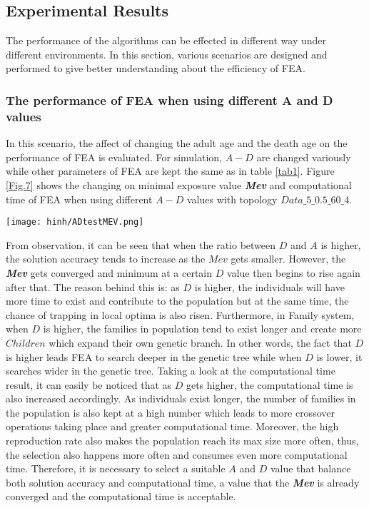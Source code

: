 \documentclass[final]{elsarticle}
\begin{document}
\subsection{Experimental Results}
The performance of the algorithms can be effected in different way under different environments. In this section, various scenarios are designed and performed to give better understanding about the efficiency of FEA.
\subsubsection{The performance of FEA when using different A and D values}
In this scenario, the affect of changing the adult age and the death age on the performance of FEA is evaluated. For simulation, $A - D$ are changed variously while other parameters of FEA are kept the same as in table \ref{tab1}. Figure \ref{Fig.7} shows the changing on minimal exposure value \textit{\textbf{Mev}} and computational time of FEA when using different $A-D$ values with topology $Data\_5\_0.5\_60\_4$.
\begin{figure*}[h]
	\texttt{[image: hinh/ADtestMEV.png]}
	\centering
	\caption{The minimal exposure value when using different A-D values
	}
	\label{Fig.7}       %
\end{figure*}

From observation, it can be seen that when the ratio between $D$ and $A$ is higher, the solution accuracy tends to increase as the $Mev$ gets smaller. However, the \textit{\textbf{Mev}} gets converged and minimum at a certain $D$ value then begins to rise again after that. The reason behind this is: as $D$ is higher, the individuals will have more time to exist and contribute to the population but at the same time, the chance of trapping in local optima is also risen. Furthermore, in Family system, when $D$ is higher, the families in population tend to exist longer and create more $Children $ which expand their own genetic branch. In other words, the fact that $D$ is higher leads FEA to search deeper in the genetic tree while when $D$ is lower, it searches wider in the genetic tree. Taking a look at the computational time result, it can easily be noticed that as $D$ gets higher, the computational time is also increased accordingly. As individuals exist longer, the number of families in the population is also kept at a high number which leads to more crossover operations taking place and greater computational time. Moreover, the high reproduction rate also makes the population reach its max size more often, thus, the selection also happens more often and consumes even more computational time. Therefore, it is necessary to select a suitable $A$ and $D$ value that balance both solution accuracy and computational time, a value that the \textbf{\textit{Mev}} is already converged and the computational time is acceptable.  
\end{document}
